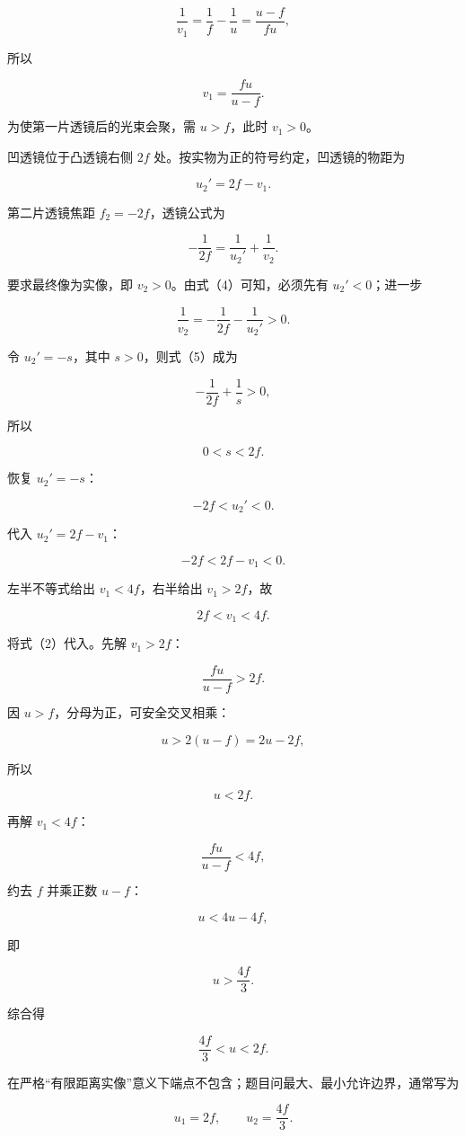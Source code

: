 \documentclass[12pt,a4paper,UTF8]{ctexart}
\begin{document}
\[
\frac1{v_1}=\frac1f-\frac1u=\frac{u-f}{fu},
\]

所以

\[
v_1=\frac{fu}{u-f}. \tag{2}
\]

为使第一片透镜后的光束会聚，需 \(u>f\)，此时 \(v_1>0\)。

凹透镜位于凸透镜右侧 \(2f\) 处。按实物为正的符号约定，凹透镜的物距为

\[
u_2'=2f-v_1. \tag{3}
\]

第二片透镜焦距 \(f_2=-2f\)，透镜公式为

\[
-\frac1{2f}=\frac1{u_2'}+\frac1{v_2}. \tag{4}
\]

要求最终像为实像，即 \(v_2>0\)。由式（4）可知，必须先有
\(u_2'<0\)；进一步

\[
\frac1{v_2}=-\frac1{2f}-\frac1{u_2'}>0. \tag{5}
\]

令 \(u_2'=-s\)，其中 \(s>0\)，则式（5）成为

\[
-\frac1{2f}+\frac1s>0,
\]

所以

\[
0<s<2f.
\]

恢复 \(u_2'=-s\)：

\[
-2f<u_2'<0. \tag{6}
\]

代入 \(u_2'=2f-v_1\)：

\[
-2f<2f-v_1<0. \tag{7}
\]

左半不等式给出 \(v_1<4f\)，右半给出 \(v_1>2f\)，故

\[
2f<v_1<4f. \tag{8}
\]

将式（2）代入。先解 \(v_1>2f\)：

\[
\frac{fu}{u-f}>2f.
\]

因 \(u>f\)，分母为正，可安全交叉相乘：

\[
u>2(u-f)=2u-2f,
\]

所以

\[
u<2f. \tag{9}
\]

再解 \(v_1<4f\)：

\[
\frac{fu}{u-f}<4f,
\]

约去 \(f\) 并乘正数 \(u-f\)：

\[
u<4u-4f,
\]

即

\[
u>\frac{4f}{3}. \tag{10}
\]

综合得

\[
\frac{4f}{3}<u<2f. \tag{11}
\]

在严格``有限距离实像''意义下端点不包含；题目问最大、最小允许边界，通常写为

\[
\boxed{u_1=2f},\qquad
\boxed{u_2=\frac{4f}{3}}. \tag{12}
\]
\end{document}
